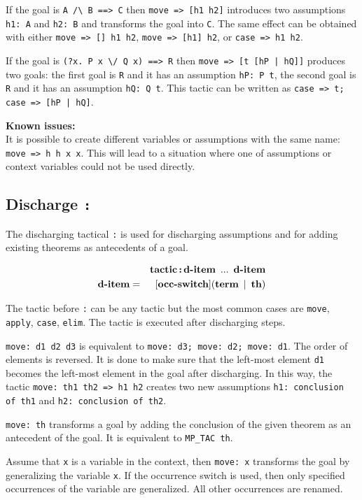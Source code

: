 \documentclass[a4paper]{article}
\newcommand{\issues}{{\bf Known issues:}\\}
\newcommand{\xx}[1]{\mathop{\text{\bf #1}}}
\begin{document}
If the goal is \verb|A /\ B ==> C| then \verb|move => [h1 h2]| introduces two assumptions \verb|h1: A| and \verb|h2: B| and transforms the goal into \verb|C|. The same effect can be obtained with either \verb|move => [] h1 h2|, \verb|move => [h1] h2|, or \verb|case => h1 h2|.

If the goal is \verb|(?x. P x \/ Q x) ==> R| then \verb$move => [t [hP | hQ]]$ produces two goals: the first goal is \verb|R| and it has an assumption \verb|hP: P t|, the second goal is \verb|R| and it has an assumption \verb|hQ: Q t|. This tactic can be written as \verb$case => t; case => [hP | hQ]$.


\issues
It is possible to create different variables or assumptions with the same name: \verb|move => h h x x|. This will lead to a situation where one of assumptions or context variables could not be used directly.

\subsection{Discharge {\tt :}}
The discharging tactical \verb|:| is used for discharging assumptions and for adding existing theorems as antecedents of a goal.

\begin{eqnarray*}
&&\xx{tactic} \xx{:} \xx{d-item}\ ...\ \xx{d-item}\\
\xx{d-item} &=& [\xx{occ-switch}](\xx{term}\ |\ \xx{th})
\end{eqnarray*}

The tactic before \verb|:| can be any tactic but the most common cases are \verb|move|, \verb|apply|, \verb|case|, \verb|elim|. The tactic is executed after discharging steps.

\verb|move: d1 d2 d3| is equivalent to \verb|move: d3; move: d2; move: d1|. The order of elements is reversed. It is done to make sure that the left-most element \verb|d1| becomes the left-most element in the goal after discharging. In this way, the tactic \verb|move: th1 th2 => h1 h2| creates two new assumptions \verb|h1: conclusion of th1| and \verb|h2: conclusion of th2|.

\verb|move: th| transforms a goal by adding the conclusion of the given theorem as an antecedent of the goal. It is equivalent to \verb|MP_TAC th|.

Assume that \verb|x| is a variable in the context, then \verb|move: x| transforms the goal by generalizing the variable \verb|x|. If the occurrence switch is used, then only specified occurrences of the variable are generalized. All other occurrences are renamed.
\end{document}
